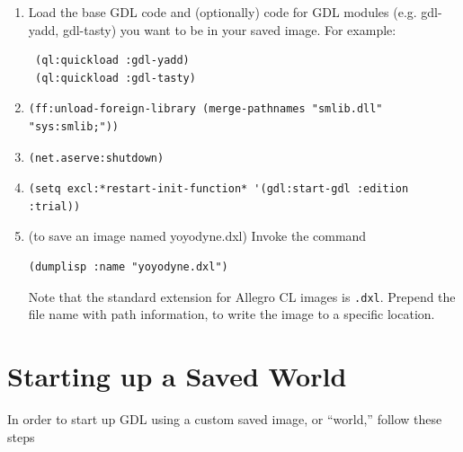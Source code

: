 \documentclass [11pt]{book}
\begin{document}
\begin{enumerate}

\item Load the base GDL code and (optionally) code for GDL
modules (e.g. gdl-yadd, gdl-tasty) you want to be in your saved image. For example:

\begin{verbatim}
 (ql:quickload :gdl-yadd) 
 (ql:quickload :gdl-tasty)
\end{verbatim}


\item



\begin{verbatim}(ff:unload-foreign-library (merge-pathnames "smlib.dll" "sys:smlib;"))
\end{verbatim}

\item



\begin{verbatim}(net.aserve:shutdown)
\end{verbatim}

\item



\begin{verbatim}(setq excl:*restart-init-function* '(gdl:start-gdl :edition :trial))
\end{verbatim}
\item  (to save an image named yoyodyne.dxl) Invoke the command 

\begin{verbatim}(dumplisp :name "yoyodyne.dxl")
\end{verbatim}Note that the standard extension for Allegro CL images is \texttt{.dxl}. Prepend the file name with path information, to write the image to a specific location.

\end{enumerate}



\section{Starting up a Saved World}

\label{sec:startingupasavedworld}

In order to start up GDL using a custom saved image, or ``world,'' follow these steps
\end{document}
